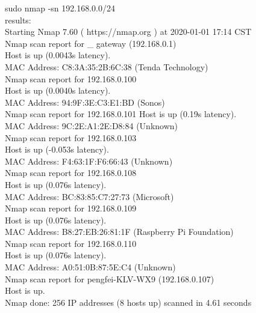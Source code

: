 \documentclass[UTF8,fancyhdr,a4paper]{ctexart}
\begin{document}
sudo nmap -sn 192.168.0.0/24\\
results:\\
Starting Nmap 7.60 ( https://nmap.org ) at 2020-01-01 17:14 CST\\
Nmap scan report for \_ gateway (192.168.0.1)\\
Host is up (0.0043s latency).\\
MAC Address: C8:3A:35:2B:6C:38 (Tenda Technology)\\
Nmap scan report for 192.168.0.100\\
Host is up (0.0040s latency).\\
MAC Address: 94:9F:3E:C3:E1:BD (Sonos)\\
Nmap scan report for 192.168.0.101
Host is up (0.19s latency).\\
MAC Address: 9C:2E:A1:2E:D8:84 (Unknown)\\
Nmap scan report for 192.168.0.103\\
Host is up (-0.053s latency).\\
MAC Address: F4:63:1F:F6:66:43 (Unknown)\\
Nmap scan report for 192.168.0.108\\
Host is up (0.076s latency).\\
MAC Address: BC:83:85:C7:27:73 (Microsoft)\\
Nmap scan report for 192.168.0.109\\
Host is up (0.076s latency).\\
MAC Address: B8:27:EB:26:81:1F (Raspberry Pi Foundation)\\
Nmap scan report for 192.168.0.110\\
Host is up (0.076s latency).\\
MAC Address: A0:51:0B:87:5E:C4 (Unknown)\\
Nmap scan report for pengfei-KLV-WX9 (192.168.0.107)\\
Host is up.\\
Nmap done: 256 IP addresses (8 hosts up) scanned in 4.61 seconds\\
\end{document}
